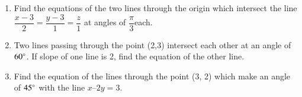 \begin{enumerate}[label=\thesubsection.\arabic*,ref=\thesubsection.\theenumi]
\item Find the equations of the two lines through the origin which intersect the line $ \dfrac{x-3}{2}=\dfrac{y-3}{1}=\dfrac{z}{1}$ at angles of  $\dfrac{\pi}{3}$each.
	\item
 Two lines passing through the point (2,3) intersect each other at an angle of $60\degree$. If slope of one line is 2, find the equation of the other line.
\label{chapters/11/10/3/12}
 \\
 \solution
		
\item Find the equation of the lines through the point (3, 2) which make an angle of $45\degree$  with the line $x – 2y = 3$.
\label{chapters/11/10/4/11}\\
\solution

\end{enumerate}
